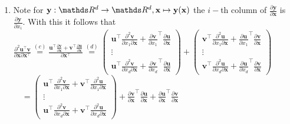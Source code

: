 \documentclass[a4paper]{article}
\begin{document}
{\begin{enumerate}
	\item Note for $\mathbf{y}:\R^d\rightarrow\R^d, \mathbf{x}\mapsto\mathbf{y}(\mathbf{x})$ the $i-$th column of $\frac{\partial\mathbf{y}}{\partial\mathbf{x}}$ is $\frac{\partial\mathbf{y}}{\partial x_i}$. With this it follows that \\
	$\frac{\partial^2 \mathbf{u}^\top \mathbf{v}}{\partial \mathbf{x}\partial\mathbf{x}^\top} \overset{(c)}{=} \frac{\mathbf{u}^\top \frac{\partial  \mathbf{v}}{\partial \mathbf{x}} + \mathbf{v}^\top \frac{\partial  \mathbf{u}}{\partial \mathbf{x}}}{\partial\mathbf{x}^\top} \overset{(d)}{=} \begin{pmatrix}	\mathbf{u}^\top \frac{\partial^2  \mathbf{v}}{\partial x_1\partial \mathbf{x}} + \frac{\partial\mathbf{v}}{\partial x_1}^\top \frac{\partial  \mathbf{u}}{\partial \mathbf{x}} \\ \vdots \\
\mathbf{u}^\top \frac{\partial^2  \mathbf{v}}{\partial x_d\partial \mathbf{x}} + \frac{\partial\mathbf{v}}{\partial x_d}^\top \frac{\partial  \mathbf{u}}{\partial \mathbf{x}}
\end{pmatrix} + \begin{pmatrix}	\mathbf{v}^\top \frac{\partial^2  \mathbf{u}}{\partial x_1\partial \mathbf{x}} + \frac{\partial\mathbf{u}}{\partial x_1}^\top \frac{\partial  \mathbf{v}}{\partial \mathbf{x}} \\ \vdots \\
\mathbf{v}^\top \frac{\partial^2  \mathbf{u}}{\partial x_d\partial \mathbf{x}} + \frac{\partial\mathbf{u}}{\partial x_d}^\top \frac{\partial  \mathbf{v}}{\partial \mathbf{x}}
\end{pmatrix}$ \\
$\quad = \begin{pmatrix}	\mathbf{u}^\top \frac{\partial^2  \mathbf{v}}{\partial x_1\partial \mathbf{x}} + \mathbf{v}^\top \frac{\partial^2  \mathbf{u}}{\partial x_1\partial \mathbf{x}} \\ \vdots \\
\mathbf{u}^\top \frac{\partial^2  \mathbf{v}}{\partial x_d\partial \mathbf{x}} + 
\mathbf{v}^\top \frac{\partial^2  \mathbf{u}}{\partial x_d\partial \mathbf{x}} 
\end{pmatrix} +  \frac{\partial \mathbf{v}}{\partial \mathbf{x}}^\top \frac{\partial \mathbf{u}}{\partial \mathbf{x}} + 
\frac{\partial \mathbf{u}}{\partial \mathbf{x}}^\top \frac{\partial \mathbf{v}}{\partial \mathbf{x}}$

	
\end{enumerate}
}
\end{document}
